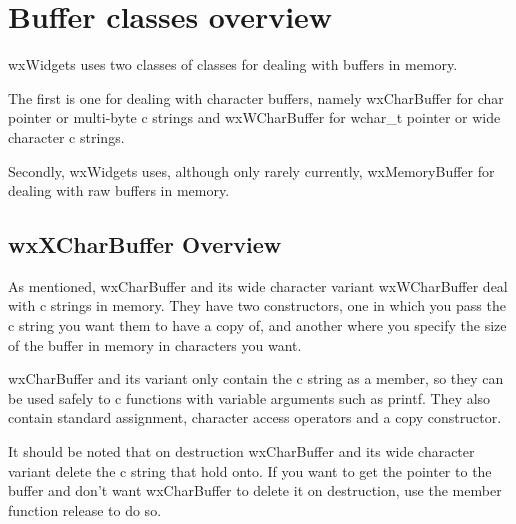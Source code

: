 
\section{Buffer classes overview}\label{bufferclasses}

wxWidgets uses two classes of classes for dealing with buffers in memory.

The first is one for dealing with character buffers, namely wxCharBuffer for char pointer or multi-byte c strings and wxWCharBuffer for wchar\_t pointer or wide character c strings.

Secondly, wxWidgets uses, although only rarely currently, wxMemoryBuffer for dealing with raw buffers in memory.

\subsection{wxXCharBuffer Overview}\label{wxcbov}


As mentioned, wxCharBuffer and its wide character variant wxWCharBuffer deal with c strings in memory.  They have two constructors, one in which you pass the c string you want them to have a copy of, and another where you specify the size of the buffer in memory in characters you want.

wxCharBuffer and its variant only contain the c string as a member, so they can be used safely to c functions with variable arguments such as printf.  They also contain standard assignment, character access operators and a copy constructor.


It should be noted that on destruction wxCharBuffer and its wide character variant delete the c string that hold onto.  If you want to get the pointer to the buffer and don't want wxCharBuffer to delete it on destruction, use the member function release to do so.

